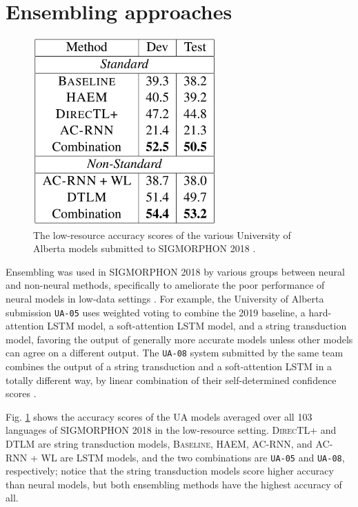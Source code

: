 \section{Ensembling approaches}

\begin{figure}[ht]
\includegraphics[width=7cm]{images/Najafi_accuracy.png}
\centering
\caption{The low-resource accuracy scores of the various University of Alberta models submitted to SIGMORPHON 2018 \parencite{Najafi2018}.}
\label{fig:Najafi}
\end{figure}

Ensembling was used in SIGMORPHON 2018 by various groups between neural and non-neural methods, specifically to ameliorate the poor performance of neural models in low-data settings \parencite{Cotterell2018b}. For example, the University of Alberta submission \texttt{UA-05} uses weighted voting to combine the 2019 baseline, a hard-attention LSTM model, a soft-attention LSTM model, and a string transduction model, favoring the output of generally more accurate models unless other models can agree on a different output. The \texttt{UA-08} system submitted by the same team combines the output of a string transduction and a soft-attention LSTM in a totally different way, by linear combination of their self-determined confidence scores \parencite{Najafi2018}.

Fig. \ref{fig:Najafi} shows the accuracy scores of the UA models averaged over all 103 languages of SIGMORPHON 2018 in the low-resource setting. \textsc{DirecTL+} and \textsc{DTLM} are string transduction models, \textsc{Baseline}, HAEM, AC-RNN, and AC-RNN + WL are LSTM models, and the two combinations are \texttt{UA-05} and \texttt{UA-08}, respectively; notice that the string transduction models score higher accuracy than neural models, but both ensembling methods have the highest accuracy of all.